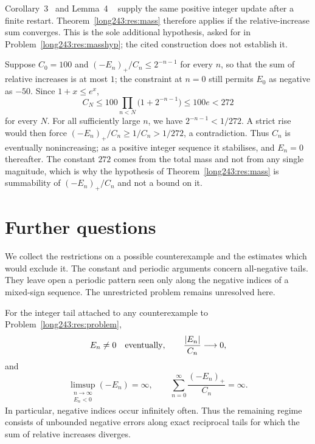 \documentclass[11pt]{article}
\begin{document}
Corollary~3~\cite[p.~9]{koizumi2025} and Lemma~4
~\cite[pp.~11--12]{koizumi2025} supply the same positive integer update
after a finite restart. Theorem~\ref{long243:res:mass} therefore applies
if the relative-increase sum converges. This is the sole additional
hypothesis, asked for in Problem~\ref{long243:res:masshyp}; the cited
construction does not establish it.

\begin{example}\label{long243:ex:mass}
Suppose $C_0=100$ and $(-E_n)_+/C_n\le2^{-n-1}$ for every $n$, so that the
sum of relative increases is at most $1$; the constraint at $n=0$ still permits
$E_0$ as negative as $-50$.  Since $1+x\le e^{x}$,
\[
 C_N\le100\prod_{n<N}\bigl(1+2^{-n-1}\bigr)\le100e<272
\]
for every $N$. For all sufficiently large $n$, we have
$2^{-n-1}<1/272$. A strict rise would then force
$(-E_n)_+/C_n\ge1/C_n>1/272$, a contradiction. Thus $C_n$ is eventually
nonincreasing; as a positive integer sequence it stabilises, and $E_n=0$
thereafter. The constant $272$ comes from the total mass and not from any single magnitude,
which is why the hypothesis of Theorem~\ref{long243:res:mass} is summability of
$(-E_n)_+/C_n$ and not a bound on it.
\end{example}

\section{Further questions}\label{long243:sec:open}

We collect the restrictions on a possible counterexample and the
estimates which would exclude it. The constant and periodic arguments
concern all-negative tails. They leave open a periodic pattern seen
only along the negative indices of a mixed-sign sequence. The
unrestricted problem remains unresolved here.

\begin{proposition}\label{long243:res:frontier}
For the integer tail attached to any counterexample to
Problem~\ref{long243:res:problem},
\[
 E_n\ne0\quad\hbox{eventually},\qquad
 \frac{|E_n|}{C_n}\longrightarrow0,
\]
and
\[
 \limsup_{\substack{n\to\infty\\E_n<0}}(-E_n)=\infty,
 \qquad
 \sum_{n=0}^{\infty}\frac{(-E_n)_+}{C_n}=\infty .
\]
In particular, negative indices occur infinitely often.  Thus the remaining
regime consists of unbounded negative errors along exact reciprocal tails for which
the sum of relative increases diverges.
\end{proposition}
\end{document}
